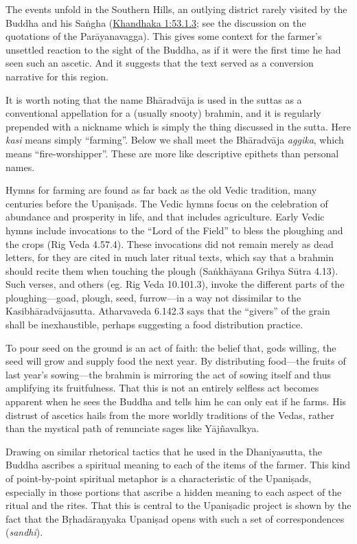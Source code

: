 \documentclass[12pt,openany]{book}%
\begin{document}
The events unfold in the Southern Hills, an outlying district rarely visited by the Buddha and his \textsanskrit{Saṅgha} (\href{https://suttacentral.net/pli{-}tv{-}kd1/en/brahmali\#53.1.3}{Khandhaka 1:53.1.3}; see the discussion on the quotations of the \textsanskrit{Parāyanavagga}). This gives some context for the farmer’s unsettled reaction to the sight of the Buddha, as if it were the first time he had seen such an ascetic. And it suggests that the text served as a conversion narrative for this region.

It is worth noting that the name \textsanskrit{Bhāradvāja} is used in the suttas as a conventional appellation for a (usually snooty) brahmin, and it is regularly prepended with a nickname which is simply the thing discussed in the sutta. Here \textit{kasi} means simply “farming”. Below we shall meet the \textsanskrit{Bhāradvāja} \textit{aggika}, which means “fire-worshipper”. These are more like descriptive epithets than personal names.

Hymns for farming are found as far back as the old Vedic tradition, many centuries before the \textsanskrit{Upaniṣads}. The Vedic hymns focus on the celebration of abundance and prosperity in life, and that includes agriculture. Early Vedic hymns include invocations to the “Lord of the Field” to bless the ploughing and the crops (Rig Veda 4.57.4). These invocations did not remain merely as dead letters, for they are cited in much later ritual texts, which say that a brahmin should recite them when touching the plough (\textsanskrit{Saṅkhāyana} Grihya \textsanskrit{Sūtra} 4.13). Such verses, and others (eg. Rig Veda 10.101.3), invoke the different parts of the ploughing—goad, plough, seed, furrow—in a way not dissimilar to the \textsanskrit{Kasibhāradvājasutta}. Atharvaveda 6.142.3 says that the “givers” of the grain shall be inexhaustible, perhaps suggesting a food distribution practice.

To pour seed on the ground is an act of faith: the belief that, gods willing, the seed will grow and supply food the next year. By distributing food—the fruits of last year’s sowing—the brahmin is mirroring the act of sowing itself and thus amplifying its fruitfulness. That this is not an entirely selfless act becomes apparent when he sees the Buddha and tells him he can only eat if he farms. His distrust of ascetics hails from the more worldly traditions of the Vedas, rather than the mystical path of renunciate sages like \textsanskrit{Yājñavalkya}.

Drawing on similar rhetorical tactics that he used in the Dhaniyasutta, the Buddha ascribes a spiritual meaning to each of the items of the farmer. This kind of point-by-point spiritual metaphor is a characteristic of the \textsanskrit{Upaniṣads}, especially in those portions that ascribe a hidden meaning to each aspect of the ritual and the rites. That this is central to the \textsanskrit{Upaniṣadic} project is shown by the fact that the \textsanskrit{Bṛhadāraṇyaka} \textsanskrit{Upaniṣad} opens with such a set of correspondences (\textit{sandhi}).
\end{document}

